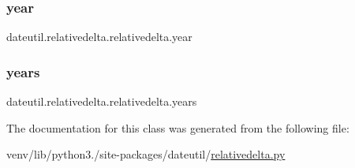\subsubsection{\texorpdfstring{year}{year}}
{\footnotesize\ttfamily dateutil.\+relativedelta.\+relativedelta.\+year}

\mbox{\label{classdateutil_1_1relativedelta_1_1relativedelta_a41d4dc9153605fba9e94a60b0553be37}} 
\subsubsection{\texorpdfstring{years}{years}}
{\footnotesize\ttfamily dateutil.\+relativedelta.\+relativedelta.\+years}



The documentation for this class was generated from the following file\+:\begin{DoxyCompactItemize}
\item 
venv/lib/python3./site-\/packages/dateutil/\hyperlink{relativedelta_8py}{relativedelta.\+py}\end{DoxyCompactItemize}
